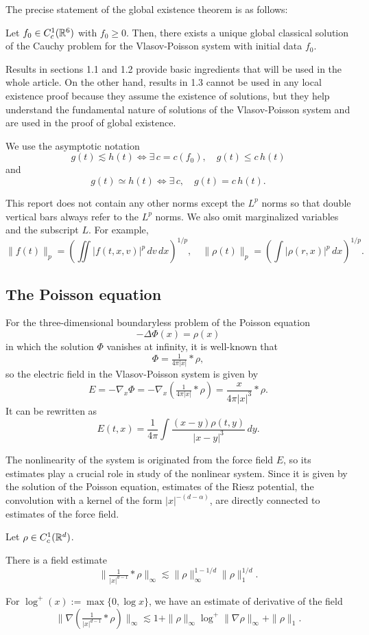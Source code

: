\documentclass[12pt]{article}
\begin{document}
The precise statement of the global existence theorem is as follows:
\begin{thm}
Let $f_0\in C_c^1(\mathbb{R}^6)$ with $f_0\ge0$.
Then, there exists a unique global classical solution of the Cauchy problem for the Vlasov-Poisson system with initial data $f_0$.
\end{thm}

Results in sections 1.1 and 1.2 provide basic ingredients that will be used in the whole article.
On the other hand, results in 1.3 cannot be used in any local existence proof because they assume the existence of solutions, but they help understand the fundamental nature of solutions of the Vlasov-Poisson system and are used in the proof of global existence.

\begin{notn*}
We use the asymptotic notation
\[g(t)\lesssim h(t)\iff\exists\,c=c(f_0),\quad g(t)\le c\,h(t)\]
and
\[g(t)\simeq h(t)\iff\exists\,c,\quad g(t)=c\,h(t).\]

This report does not contain any other norms except the $L^p$ norms so that double vertical bars always refer to the $L^p$ norms.
We also omit marginalized variables and the subscript $L$.
For example,
\[\|f(t)\|_p=(\iint|f(t,x,v)|^p\,dv\,dx)^{1/p},\quad\|\rho(t)\|_p=(\int|\rho(r,x)|^p\,dx)^{1/p}.\]
\end{notn*}



\subsection{The Poisson equation}
For the three-dimensional boundaryless problem of the Poisson equation
\[-\Delta\Phi(x)=\rho(x)\]
in which the solution $\Phi$ vanishes at infinity, it is well-known that
\[\Phi=\tfrac1{4\pi|x|}*\rho,\]
so the electric field in the Vlasov-Poisson system is given by
\[E=-\nabla_x\Phi=-\nabla_x(\tfrac1{4\pi|x|}*\rho)=\frac{x}{4\pi|x|^3}*\rho.\]
It can be rewritten as
\[E(t,x)=\frac1{4\pi}\int\frac{(x-y)\rho(t,y)}{|x-y|^3}\,dy.\]

The nonlinearity of the system is originated from the force field $E$, so its estimates play a crucial role in study of the nonlinear system.
Since it is given by the solution of the Poisson equation, estimates of the Riesz potential, the convolution with a kernel of the form $|x|^{-(d-\alpha)}$, are directly connected to estimates of the force field.

\begin{lem}
Let $\rho\in C_c^1(\mathbb{R}^d)$.
\begin{parts}
\item
There is a field estimate
\[\|\tfrac1{|x|^{d-1}}*\rho\|_\infty\lesssim\|\rho\|_\infty^{1-1/d}\|\rho\|_1^{1/d}.\]
\item
For $\log^+(x):=\max\{0,\log x\}$, we have an estimate of derivative of the field
\[\|\nabla(\tfrac1{|x|^{d-1}}*\rho)\|_\infty\lesssim1+\|\rho\|_\infty\log^+\|\nabla\rho\|_\infty+\|\rho\|_1.\]
\end{parts}
\end{lem}
\end{document}
